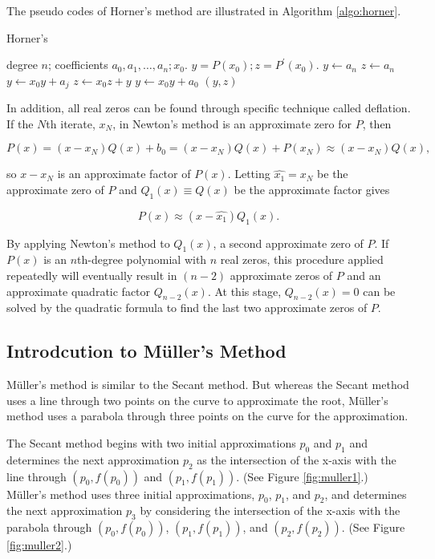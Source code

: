 \documentclass[preprint,12pt]{elsarticle}
\begin{document}
The pseudo codes of Horner's method are illustrated in Algorithm \ref{algo:horner}.

\begin{algorithm}
    \caption{Horner's}
    \label{algo:horner}
    \begin{algorithmic}[1]
    \Require degree $n$; coefficients $a_0, a_1,\dots,a_n;x_0$.
    \Ensure $y=P(x_0);z=P^{'}(x_0).$
    \State $y\gets a_n$
    \State $z\gets a_n$
        \State $y\gets x_0 y+a_j$
        \State $z\gets x_0 z+y$
    \EndFor
    \State $y\gets x_0 y+a_0$
    \State \Return $(y,z)$
    \end{algorithmic}
\end{algorithm}

In addition, all real zeros can be found through specific technique called deflation. If the $N$th iterate, $x_N$, in Newton's method is an approximate zero for $P$, then

\begin{equation}
    P(x)=(x-x_N)Q(x)+b_0=(x-x_N)Q(x)+P(x_N)\approx(x-x_N)Q(x),
\end{equation}

so $x-x_N$ is an approximate factor of $P(x)$. Letting $\hat{x_1}=x_N$ be the approximate zero of $P$ and $Q_1(x)\equiv Q(x)$ be the approximate factor gives

\begin{equation}
    P(x)\approx(x-\hat{x_1})Q_1(x).
\end{equation}

By applying Newton's method to $Q_1(x)$, a second approximate zero of $P$. If $P(x)$ is an $n$th-degree polynomial with $n$ real zeros, this procedure applied repeatedly will eventually result in $(n-2)$ approximate zeros of $P$ and an approximate quadratic factor $Q_{n-2}(x)$. At this stage, $Q_{n-2}(x)=0$ can be solved by the quadratic formula to find the last two approximate zeros of $P$.

\subsection{Introdcution to M\"uller's Method}
\label{SS:2.3}

M\"uller's method is similar to the Secant method. But whereas the Secant method uses a line through two points on the curve to approximate the root, M\"uller's method uses a parabola through three points on the curve for the approximation.

The Secant method begins with two initial approximations $p_0$ and $p_1$ and determines the next approximation $p_2$ as the intersection of the x-axis with the line through $(p_0,f(p_0))$ and $(p_1,f(p_1))$. (See Figure \ref{fig:muller1}.) M\"uller's method uses three initial approximations, $p_0$, $p_1$, and $p_2$, and determines the next approximation $p_3$ by considering the intersection of the x-axis with the parabola through $(p_0,f(p_0))$, $(p_1,f(p_1))$, and $(p_2,f(p_2))$. (See Figure \ref{fig:muller2}.)
\end{document}
